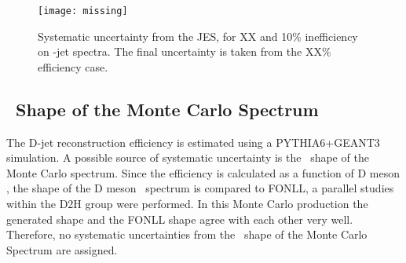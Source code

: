\begin{figure}[bth]
\centering
\texttt{[image: missing]}
\caption{Systematic uncertainty from the JES, for {\color{red}XX} and 10\% inefficiency on \Dzero-jet spectra. The final uncertainty is taken from the {\color{red}XX}\% efficiency case. }
\label{fig:JESsys_Dzero}
\end{figure}


\subsection{\pt\ Shape of the Monte Carlo Spectrum}

The D-jet reconstruction efficiency is estimated using a PYTHIA6+GEANT3 simulation.
A possible source of systematic uncertainty is the \ptd\ shape of the Monte Carlo spectrum.
Since the efficiency is calculated as a function of D meson , the shape of the D meson \ptd\ spectrum is compared to FONLL, a parallel studies within the D2H group were performed. In this Monte Carlo production the generated shape and the FONLL shape agree with each other very well. Therefore, no systematic uncertainties from the \ptd\ shape of the Monte Carlo Spectrum are assigned.



